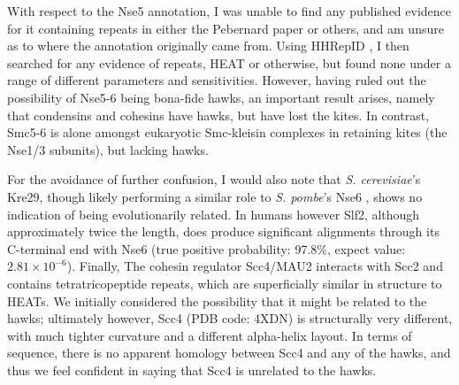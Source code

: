\documentclass[a4paper,11pt,twoside,openright]{scrbook}
\begin{document}
With respect to the Nse5 annotation, I was unable to find any published evidence for it containing repeats in either the Pebernard paper or others, and am unsure as to where the annotation originally came from. Using HHRepID \cite{Biegert2008}, I then searched for any evidence of repeats, HEAT or otherwise, but found none under a range of different parameters and sensitivities. However, having ruled out the possibility of Nse5-6 being bona-fide hawks, an important result arises, namely that condensins and cohesins have hawks, but have lost the kites. In contrast, Smc5-6 is alone amongst eukaryotic Smc-kleisin complexes in retaining kites (the Nse1/3 subunits), but lacking hawks.

For the avoidance of further confusion, I would also note that \textit{S. cerevisiae}'s Kre29, though likely performing a similar role to \textit{S. pombe}’s Nse6 \cite{Duan2009}, shows no indication of being evolutionarily related. In humans however Slf2, although approximately twice the length, does produce significant alignments through its C-terminal end with Nse6 (true positive probability: 97.8\%, expect value: $2.81\times10^{-6}$). Finally, The cohesin regulator Scc4/MAU2 interacts with Scc2 and contains tetratricopeptide repeats, which are superficially similar in structure to HEATs. We initially considered the possibility that it might be related to the hawks; ultimately however, Scc4 (PDB code: 4XDN) is structurally very different, with much tighter curvature and a different alpha-helix layout. In terms of sequence, there is no apparent homology between Scc4 and any of the hawks, and thus we feel confident in saying that Scc4 is unrelated to the hawks.
\end{document}
